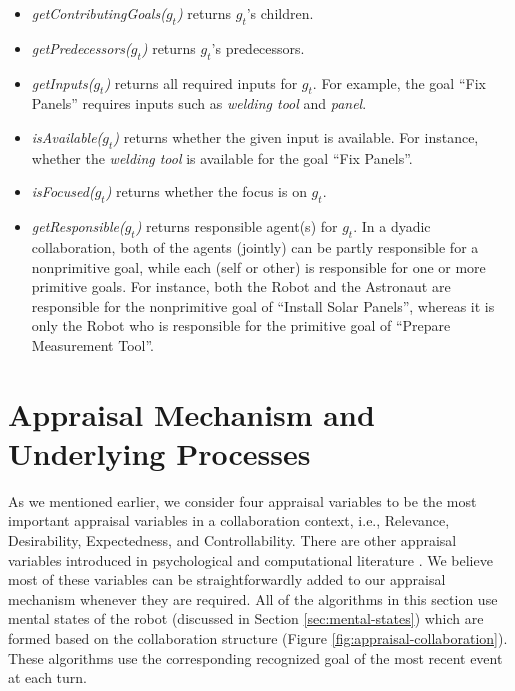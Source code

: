 \documentclass[12pt]{report}
\begin{document}
\begin{itemize}
  
  \item \textit{getContributingGoals($g_t$)} returns $g_t$'s children.
  
  \item \textit{getPredecessors($g_t$)} returns $g_t$'s predecessors.
  
  \item \textit{getInputs($g_t$)} returns all required inputs for $g_t$. For
  example, the goal ``Fix Panels'' requires inputs such as \textit{welding tool}
  and \textit{panel}.
  
  \item \textit{isAvailable($g_t$)} returns whether the given input is
  available. For instance, whether the \textit{welding tool} is available for the
  goal ``Fix Panels''.
  
  
  \item \textit{isFocused($g_t$)} returns whether the focus is on $g_t$.
  
  \item \textit{getResponsible($g_t$)} returns responsible agent(s) for $g_t$.
  In a dyadic collaboration, both of the agents (jointly) can be partly
  responsible for a nonprimitive goal, while each (self or other) is responsible
  for one or more primitive goals. For instance, both the Robot and the
  Astronaut are responsible for the nonprimitive goal of ``Install Solar
  Panels'', whereas it is only the Robot who is responsible for the
  primitive goal of ``Prepare Measurement Tool''.
\end{itemize}

\section{Appraisal Mechanism and Underlying Processes}
\label{sec:appraisal}
As we mentioned earlier, we consider four appraisal variables to be the most
important appraisal variables in a collaboration context, i.e., Relevance,
Desirability, Expectedness, and Controllability. There are other appraisal
variables introduced in psychological \cite{scherer:appraisal-processes} and
computational literature \cite{gratch:domain-independent}. We believe most of
these variables can be straightforwardly added to our appraisal mechanism
whenever they are required. All of the algorithms in this section use mental
states of the robot (discussed in Section \ref{sec:mental-states}) which are
formed based on the collaboration structure (Figure
\ref{fig:appraisal-collaboration}). These algorithms use the corresponding
recognized goal of the most recent event at each turn.
\end{document}
